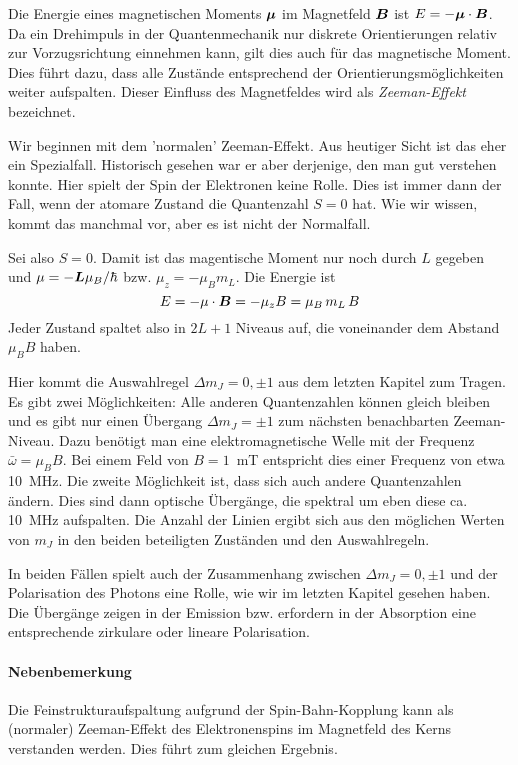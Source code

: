 Die Energie eines magnetischen Moments $\boldsymbol{\mu}$ im Magnetfeld $\boldsymbol{B}$ ist $E = - \boldsymbol{\mu} \cdot \boldsymbol{B}$. Da ein Drehimpuls in der Quantenmechanik nur diskrete Orientierungen relativ zur Vorzugsrichtung einnehmen kann, gilt dies auch für das magnetische Moment. Dies führt dazu, dass alle Zustände entsprechend der Orientierungsmöglichkeiten weiter aufspalten. Dieser Einfluss des Magnetfeldes wird als \emph{Zeeman-Effekt} bezeichnet. 

Wir beginnen mit dem 'normalen' Zeeman-Effekt. Aus heutiger Sicht ist das eher ein Spezialfall. Historisch gesehen war er aber derjenige, den man gut verstehen konnte. Hier spielt der Spin der Elektronen keine Rolle. Dies ist immer dann der Fall, wenn der atomare Zustand die Quantenzahl $S=0$ hat. Wie wir wissen, kommt das manchmal vor, aber es ist nicht der Normalfall.

Sei also $S=0$. Damit ist das magentische Moment nur noch durch $L$ gegeben und $\mu = - \boldsymbol{L} \mu_B / \hbar$ bzw. $\mu_z = - \mu_B  m_L$. Die Energie ist
\begin{equation}
    E = - \mu \cdot \boldsymbol{B} =- \mu_z B =  \mu_B \, m_L \, B
\end{equation}
Jeder Zustand spaltet also in $2L + 1$ Niveaus auf, die voneinander dem Abstand $\mu_B B$ haben.

Hier kommt die Auswahlregel $\Delta m_J = 0, \pm1$ aus dem letzten Kapitel zum Tragen. Es gibt zwei Möglichkeiten: Alle anderen Quantenzahlen können gleich bleiben und es gibt nur einen Übergang $\Delta m_J = \pm1$ zum nächsten benachbarten Zeeman-Niveau. Dazu benötigt man eine elektromagnetische Welle mit der Frequenz $\bar \omega = \mu_B B$. Bei einem Feld von $B=1$~mT entspricht dies einer Frequenz von etwa 10~MHz. Die zweite Möglichkeit ist, dass sich auch andere Quantenzahlen ändern. Dies sind dann optische Übergänge, die spektral um eben diese ca. 10~MHz aufspalten. Die Anzahl der Linien ergibt sich aus den möglichen Werten von $m_J$ in den beiden beteiligten Zuständen und den Auswahlregeln.


In beiden Fällen spielt auch der Zusammenhang zwischen $\Delta m_J = 0, \pm1$ und der Polarisation des Photons eine Rolle, wie wir im letzten Kapitel gesehen haben. Die Übergänge zeigen in der Emission bzw. erfordern in der Absorption eine entsprechende zirkulare oder lineare Polarisation.


\paragraph{Nebenbemerkung} Die Feinstrukturaufspaltung aufgrund der Spin-Bahn-Kopplung kann als (normaler) Zeeman-Effekt des Elektronenspins im Magnetfeld des Kerns verstanden werden. Dies führt zum gleichen Ergebnis.

